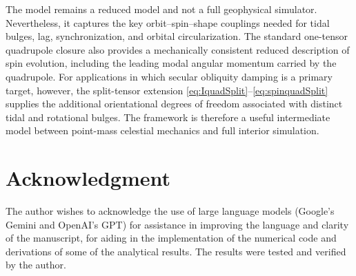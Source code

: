 \documentclass[journal, a4paper]{IEEEtran}
\begin{document}
The model remains a reduced model and not a full geophysical simulator.
Nevertheless, it captures the key orbit--spin--shape couplings needed for
tidal bulges, lag, synchronization, and orbital circularization. The standard
one-tensor quadrupole closure also provides a mechanically consistent reduced
description of spin evolution, including the leading modal angular momentum
carried by the quadrupole. For applications in which secular obliquity damping
is a primary target, however, the split-tensor extension
\eqref{eq:IquadSplit}--\eqref{eq:spinquadSplit} supplies the additional
orientational degrees of freedom associated with distinct tidal and rotational
bulges. The framework is therefore a useful intermediate model between
point-mass celestial mechanics and full interior simulation.
\section*{Acknowledgment}
The author wishes to acknowledge the use of large language models (Google's Gemini and OpenAI's GPT) for assistance in improving the language and clarity of the manuscript, for aiding in the implementation of the numerical code and derivations of some of the analytical results. The results were tested and verified by the author.
\end{document}
